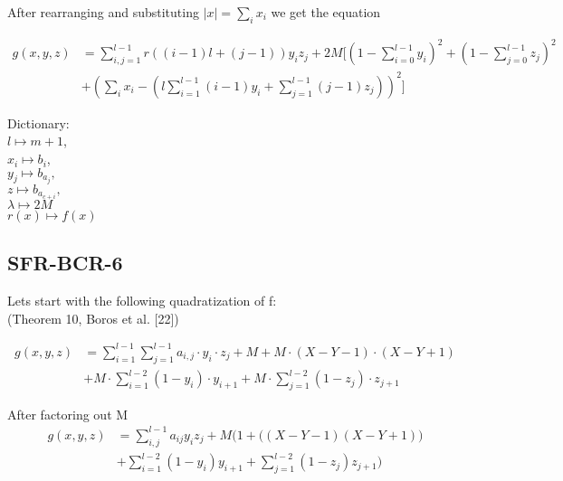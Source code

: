 \documentclass[a4paper,11pt]{article}
\begin{document}
After rearranging and substituting $|x| = \sum_ix_i$ we get the equation

\begin{equation}
  \begin{split}
  \left.
  g(x,y,z)
  \right.
  &= \sum_{i,j=1}^{l-1}r((i-1)l+(j-1))y_iz_j
  + 2M\Bigg[\left(1-\sum_{i=0}^{l-1}y_i\right)^2 + \left(1-\sum_{j=0}^{l-1}z_j\right)^2\\
  &+ \left(\sum_ix_i - \left(l\sum_{i=1}^{l-1}(i-1)y_i + \sum_{j=1}^{l-1}(j-1)z_j\right)\right)^2\Bigg]
  \end{split}
\end{equation}

Dictionary: \\
$l\mapsto m + 1$,\\
$x_i\mapsto b_i$, \\
$y_j\mapsto b_{a_j},$\\
$z\mapsto b_{a_{c+i}},$\\
$\lambda\mapsto 2M$\\
$r(x)\mapsto f(x)$


\subsection{SFR-BCR-6}

Lets start with the following quadratization of f:
\\(Theorem 10, Boros et al. [22])

\begin{equation}
  \begin{split}
  \left.
  g(x,y,z)
  \right.
  &= \sum_{i=1}^{l-1}\sum_{j=1}^{l-1}a_{i,j}\cdot y_i\cdot z_j + M
  + M\cdot(X-Y-1)\cdot(X-Y+1)\\
  &+ M\cdot\sum_{i=1}^{l-2}(1-y_i)\cdot y_{i+1} + M\cdot\sum_{j=1}^{l-2}(1-z_j)\cdot z_{j+1}
  \end{split}
\end{equation}

After factoring out M
\begin{equation}
  \begin{split}
  \left.
  g(x,y,z)
  \right.
  &= \sum_{i,j}^{l-1}a_{ij}y_iz_j + M\Big(1 + \Big((X-Y-1)(X-Y+1)\Big)\\
  &+ \sum_{i=1}^{l-2}(1-y_i)y_{i+1} + \sum_{j=1}^{l-2}(1-z_j)z_{j+1}\Big)
  \end{split}
\end{equation}
\end{document}
